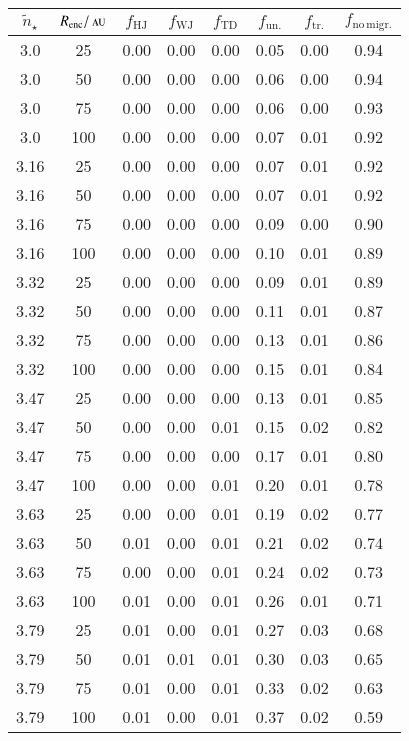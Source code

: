 \documentclass[iop,usenatbib]{emulateapj}
\newcommand{\au}{\,\textsc{au}}
\newcommand{\renc}{R_\mathrm{enc}}
\begin{document}
\begin{table}
{\fontsize{7.5}{7} \selectfont
\begin{tabular}{cccccccc}
\toprule
$\tilde{n}_\star$ & $\renc/\au$ & $f_\mathrm{HJ}$ & $f_\mathrm{WJ}$ & $f_\mathrm{TD}$ & $f_\mathrm{un.}$ & $f_\mathrm{tr.}$ & $f_\mathrm{no\,migr.}$ \\
\midrule
3.0 & 25 & 0.00 & 0.00 & 0.00 & 0.05 & 0.00 & 0.94 \\
3.0 & 50 & 0.00 & 0.00 & 0.00 & 0.06 & 0.00 & 0.94 \\
3.0 & 75 & 0.00 & 0.00 & 0.00 & 0.06 & 0.00 & 0.93 \\
3.0 & 100 & 0.00 & 0.00 & 0.00 & 0.07 & 0.01 & 0.92 \\
3.16 & 25 & 0.00 & 0.00 & 0.00 & 0.07 & 0.01 & 0.92 \\
3.16 & 50 & 0.00 & 0.00 & 0.00 & 0.07 & 0.01 & 0.92 \\
3.16 & 75 & 0.00 & 0.00 & 0.00 & 0.09 & 0.00 & 0.90 \\
3.16 & 100 & 0.00 & 0.00 & 0.00 & 0.10 & 0.01 & 0.89 \\
3.32 & 25 & 0.00 & 0.00 & 0.00 & 0.09 & 0.01 & 0.89 \\
3.32 & 50 & 0.00 & 0.00 & 0.00 & 0.11 & 0.01 & 0.87 \\
3.32 & 75 & 0.00 & 0.00 & 0.00 & 0.13 & 0.01 & 0.86 \\
3.32 & 100 & 0.00 & 0.00 & 0.00 & 0.15 & 0.01 & 0.84 \\
3.47 & 25 & 0.00 & 0.00 & 0.00 & 0.13 & 0.01 & 0.85 \\
3.47 & 50 & 0.00 & 0.00 & 0.01 & 0.15 & 0.02 & 0.82 \\
3.47 & 75 & 0.00 & 0.00 & 0.00 & 0.17 & 0.01 & 0.80 \\
3.47 & 100 & 0.00 & 0.00 & 0.01 & 0.20 & 0.01 & 0.78 \\
3.63 & 25 & 0.00 & 0.00 & 0.01 & 0.19 & 0.02 & 0.77 \\
3.63 & 50 & 0.01 & 0.00 & 0.01 & 0.21 & 0.02 & 0.74 \\
3.63 & 75 & 0.00 & 0.00 & 0.01 & 0.24 & 0.02 & 0.73 \\
3.63 & 100 & 0.01 & 0.00 & 0.01 & 0.26 & 0.01 & 0.71 \\
3.79 & 25 & 0.01 & 0.00 & 0.01 & 0.27 & 0.03 & 0.68 \\
3.79 & 50 & 0.01 & 0.01 & 0.01 & 0.30 & 0.03 & 0.65 \\
3.79 & 75 & 0.01 & 0.00 & 0.01 & 0.33 & 0.02 & 0.63 \\
3.79 & 100 & 0.01 & 0.00 & 0.01 & 0.37 & 0.02 & 0.59 \\

\end{tabular}}
\end{table}
\end{document}
